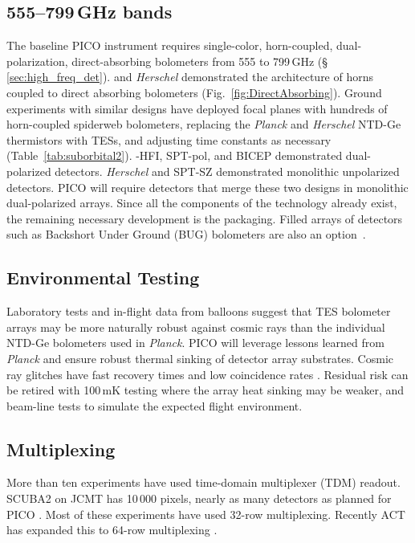 \subsection{555--799\,GHz bands}
\label{sec:dev_arrays}

The baseline PICO instrument requires single-color, horn-coupled, dual-polarization, direct-absorbing bolometers from 555 to 799\,GHz (\S\,\ref{sec:high_freq_det}).  \planck and \textit{Herschel} demonstrated the architecture of horns coupled to direct absorbing bolometers (Fig.~\ref{fig:DirectAbsorbing}).    Ground experiments with similar designs have deployed focal planes with hundreds of horn-coupled spiderweb bolometers, replacing the \textit{Planck} and \textit{Herschel} NTD-Ge thermistors with TESs, and adjusting time constants as necessary (Table~\ref{tab:suborbital2}). \planck -HFI, SPT-pol, and BICEP demonstrated dual-polarized detectors. \textit{Herschel} and SPT-SZ demonstrated monolithic unpolarized detectors. PICO will require detectors that merge these two designs in monolithic dual-polarized arrays. Since all the components of the technology already exist, the remaining necessary development is the packaging. Filled arrays of detectors such as Backshort Under Ground (BUG) bolometers are also an option~\citep{Staguhn2006}.


\subsection{Environmental Testing}
\label{sec:env_testing}
Laboratory tests and in-flight data from balloons suggest that TES
bolometer arrays may be more naturally robust against cosmic rays than
the individual NTD-Ge bolometers used in \textit{Planck}. PICO will leverage lessons
learned from \textit{Planck} and ensure robust thermal sinking of
detector array substrates. Cosmic ray
glitches have fast recovery times and low coincidence rates
\citep{SPIDER2018,Filippini_inprep}. Residual risk can be retired with 100\,mK
testing where the array heat sinking may be weaker, and beam-line
tests to simulate the expected flight environment.

\subsection{Multiplexing}
\label{sec:multiplexing}

More than ten experiments have used time-domain multiplexer (TDM)
readout. SCUBA2 on JCMT has 10\,000 pixels, nearly as many detectors
as planned for PICO \citep{Holland2013}. Most of these experiments
have used 32-row multiplexing. Recently ACT has expanded this to
64-row multiplexing \citep{Henderson2016}.

